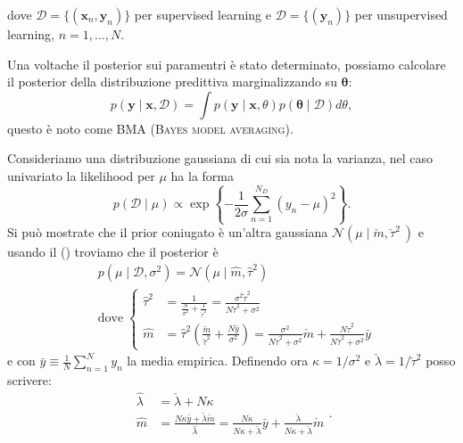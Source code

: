 \documentclass[10pt]{article}
\newcommand{\ve}[1]{\bm{#1}}
\newcommand{\im}[1]{\textsc{#1}}
\newcommand{\cond}{\mid}
\newcommand{\Crefn}[1]{\Cref{#1} (\nameref{#1})}
\theoremstyle{definition}
\begin{document}
    dove \(\mathcal{D} = \{ \left( \ve{x}_n, \ve{y}_n \right) \} \) per supervised learning
    e \(\mathcal{D} = \{ \left( \ve{y}_n \right) \} \) per unsupervised learning, \(n = 1,\ldots, N \).

    Una voltache il posterior sui paramentri è stato determinato, possiamo calcolare il posterior
    della distribuzione predittiva marginalizzando su \(\ve{\theta}\):
    \begin{equation}
        p \left( \ve{y}\cond\ve{x}, \mathcal{D} \right) = \int p \left( \ve{y}\cond\ve{x}, \theta \right) p \left( \ve{\theta}\cond\mathcal{D} \right) d\theta,
    \end{equation}
    questo è noto come BMA (\im{Bayes model averaging}).

    Consideriamo una distribuzione gaussiana di cui sia nota la varianza, nel caso univariato la
    likelihood per \(\mu\) ha la forma
    \begin{equation}
        p \left( \mathcal{D}\cond\mu \right) \propto \exp \left\{ - \frac{1}{2\sigma} \sum_{n=1}^{N_D} \left( y_n - \mu \right)^2 \right\}.
    \end{equation}
    Si può mostrate che il prior coniugato è un'altra gaussiana
    \(\mathcal{N}\left( \mu\cond\check{m}, \check{\tau}^2 \ \right)\) e usando il \Crefn{teo:bayes} troviamo che il
    posterior è
    \begin{equation}
        \begin{split}
            &p \left( \mu\cond\mathcal{D}, \sigma^2 \right) = \mathcal{N} \left( \mu\cond\hat{m}, \hat{\tau}^2 \right) \\
            &\text{dove}\;
                \left\{\begin{array}{ll}
                    \hat{\tau}^2 &= \frac{1}{\frac{N}{\sigma^2} + \frac{1}{\check{\tau}^2}} = \frac{\sigma^2\check{\tau}^2}{N\check{\tau}^2 + \sigma^2} \\
                    \hat{m} &= \hat{\tau}^2 \left( \frac{\check{m}}{\check{\tau}^2} + \frac{N\bar{y}}{\sigma^2} \right) = \frac{\sigma^2}{N\check{\tau}^2 + \sigma^2}\check{m} + \frac{N\check{\tau}^2}{N\check{\tau}^2 + \sigma^2}\bar{y}                    
                \end{array}\right.
        \end{split}
    \end{equation}
    e con \(\bar{y}\equiv\frac{1}{N}\sum_{n=1}^N y_n\) la media empirica.
    Definendo ora \(\kappa = 1/\sigma^2\) e \(\check{\lambda} = 1/\check{\tau}^2\) posso scrivere:
    \begin{equation}
        \begin{split}
            \hat{\lambda} &= \check{\lambda} + N\kappa \\
            \hat{m} &= \frac{N\kappa\bar{y} + \check{\lambda}\check{m}}{\hat{\lambda}} = \frac{N\kappa}{N\kappa + \check{\lambda}}\bar{y} + \frac{\check{\lambda}}{N\kappa + \check{\lambda}}\check{m}
        \end{split}.
    \end{equation}
\end{document}
